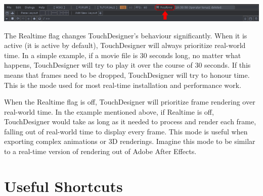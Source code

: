 \begin{fullwidth}

\begin{center}
\includegraphics{./img/2.8/realtime-1.png}
\end{center}

The Realtime flag changes TouchDesigner's behaviour significantly. When it is active (it is active by default), TouchDesigner will always prioritize real-world time. In a simple example, if a movie file is 30 seconds long, no matter what happens, TouchDesigner will try to play it over the course of 30 seconds. If this means that frames need to be dropped, TouchDesigner will try to honour time. This is the mode used for most real-time installation and performance work. 

When the Realtime flag is off, TouchDesigner will prioritize frame rendering over real-world time. In the example mentioned above, if Realtime is off, TouchDesigner would take as long as it needed to process and render each frame, falling out of real-world time to display every frame. This mode is useful when exporting complex animations or 3D renderings. Imagine this mode to be similar to a real-time version of rendering out of Adobe After Effects. 

\end{fullwidth}
\section{Useful Shortcuts}

